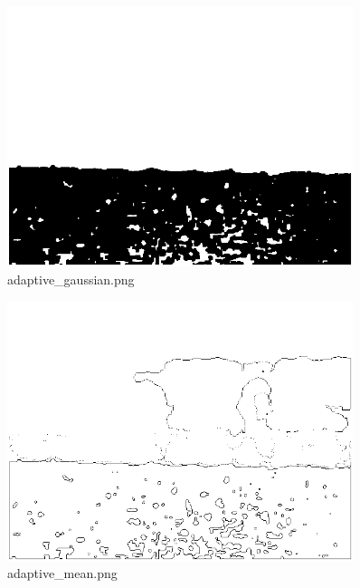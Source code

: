 \documentclass[a4paper,11pt]{article}
\begin{document}
\begin{figure}[p]
	\centering
	\includegraphics[width=0.9\textwidth]{images/morph_transform/global_mask.png}
	\caption{adaptive\_gaussian.png}
\end{figure}
\clearpage

\clearpage
\begin{figure}[p]
	\centering
	\includegraphics[width=0.9\textwidth]{images/morph_transform/adaptive_mean.png}
	\caption{adaptive\_mean.png}
\end{figure}
\end{document}

